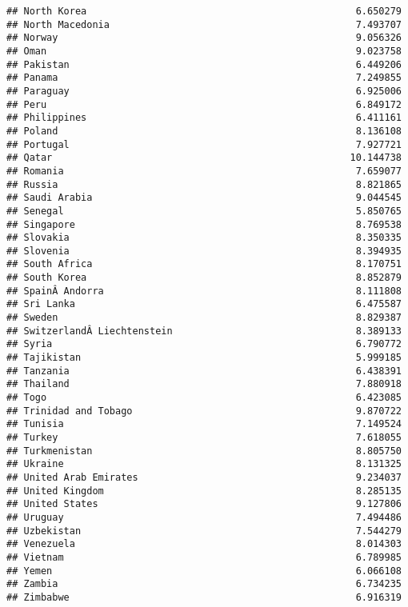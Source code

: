 \documentclass[
]{article}
\begin{document}
\begin{verbatim}
## North Korea                                               6.650279
## North Macedonia                                           7.493707
## Norway                                                    9.056326
## Oman                                                      9.023758
## Pakistan                                                  6.449206
## Panama                                                    7.249855
## Paraguay                                                  6.925006
## Peru                                                      6.849172
## Philippines                                               6.411161
## Poland                                                    8.136108
## Portugal                                                  7.927721
## Qatar                                                    10.144738
## Romania                                                   7.659077
## Russia                                                    8.821865
## Saudi Arabia                                              9.044545
## Senegal                                                   5.850765
## Singapore                                                 8.769538
## Slovakia                                                  8.350335
## Slovenia                                                  8.394935
## South Africa                                              8.170751
## South Korea                                               8.852879
## SpainÂ Andorra                                            8.111808
## Sri Lanka                                                 6.475587
## Sweden                                                    8.829387
## SwitzerlandÂ Liechtenstein                                8.389133
## Syria                                                     6.790772
## Tajikistan                                                5.999185
## Tanzania                                                  6.438391
## Thailand                                                  7.880918
## Togo                                                      6.423085
## Trinidad and Tobago                                       9.870722
## Tunisia                                                   7.149524
## Turkey                                                    7.618055
## Turkmenistan                                              8.805750
## Ukraine                                                   8.131325
## United Arab Emirates                                      9.234037
## United Kingdom                                            8.285135
## United States                                             9.127806
## Uruguay                                                   7.494486
## Uzbekistan                                                7.544279
## Venezuela                                                 8.014303
## Vietnam                                                   6.789985
## Yemen                                                     6.066108
## Zambia                                                    6.734235
## Zimbabwe                                                  6.916319
\end{verbatim}
\end{document}
